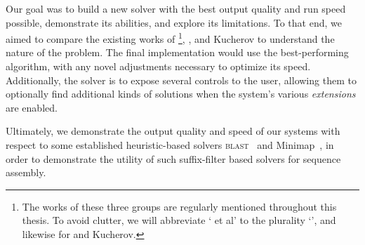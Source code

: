 Our goal was to build a new \aspop{} solver with the best output quality and run speed possible, demonstrate its abilities, and explore its limitations. To that end, we aimed to compare the existing works of \kark{}\footnote{The works of these three groups are regularly mentioned throughout this thesis. To avoid clutter, we will abbreviate `\kark{} et al' to the plurality `\kark{}', and likewise for \vali{} and Kucherov.}, \vali{}, and Kucherov to understand the nature of the problem. The final implementation would use the best-performing algorithm, with any novel adjustments necessary to optimize its speed. Additionally, the solver is to expose several controls to the user, allowing them to optionally find additional kinds of \glspl{solution} when the system's various \textit{extensions} are enabled.

Ultimately, we demonstrate the output quality and speed of our systems with respect to some established heuristic-based solvers \textsc{blast}~\cite{blast} and Minimap~\cite{minimap}, in order to demonstrate the utility of such suffix-filter based solvers for sequence assembly.
